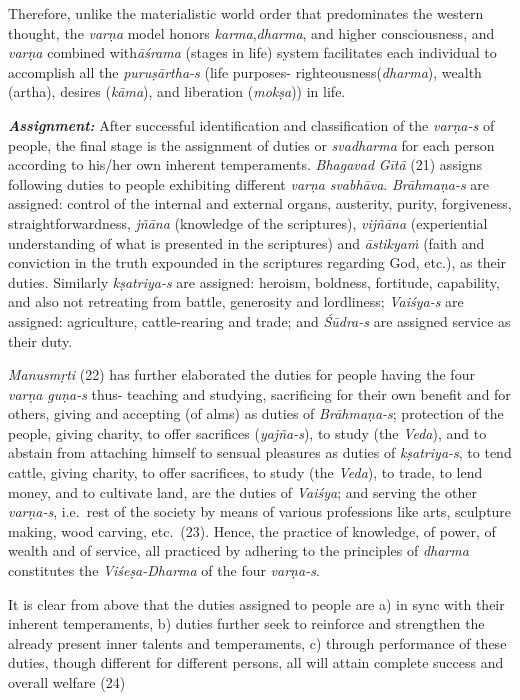 Therefore, unlike the materialistic world order that predominates the western thought, the \emph{varṇa} model honors \emph{karma},\break \emph{dharma}, and higher consciousness, and \emph{varṇa} combined with\break \emph{āśrama} (stages in life) system facilitates each individual to accomplish all the \emph{puruṣārtha-s} (life purposes- righteousness\break (\emph{dharma}), wealth (artha), desires (\emph{kāma}), and liberation (\emph{mokṣa})) in life.

\emph{\textbf{Assignment:}} After successful identification and classification of the \emph{varṇa-s} of people, the final stage is the assignment of duties or \emph{svadharma} for each person according to his/her own inherent temperaments. \emph{Bhagavad} \emph{Gītā} (21) assigns following duties to people exhibiting different \emph{varṇa} \emph{svabhāva}. \emph{Brāhmaṇa-s} are assigned: control of the internal and external organs, austerity, purity, forgiveness, straightforwardness, \emph{jñāna} (knowledge of the scriptures), \emph{vijñāna} (experiential understanding of what is presented in the scriptures) and \emph{āstikyaṁ} (faith and conviction in the truth expounded in the scriptures regarding God, etc.), as their duties. Similarly \emph{kṣatriya-s} are assigned: heroism, boldness, fortitude, capability, and also not retreating from battle, generosity and lordliness; \emph{Vaiśya-s} are assigned: agriculture, cattle-rearing and trade; and \emph{Śūdra-s} are assigned service as their duty.

\emph{Manusmṛti} (22) has further elaborated the duties for people having the four \emph{varṇa} \emph{guṇa-s} thus- teaching and studying, sacrificing for their own benefit and for others, giving and accepting (of alms) as duties of \emph{Brāhmaṇa-s}; protection of the people, giving charity, to offer sacrifices (\emph{yajña-s}), to study (the \emph{Veda}), and to abstain from attaching himself to sensual pleasures as duties of \emph{kṣatriya-s}, to tend cattle, giving charity, to offer sacrifices, to study (the \emph{Veda}), to trade, to lend money, and to cultivate land, are the duties of \emph{Vaiśya}; and serving the other \emph{varṇa-s}, i.e.\ rest of the society by means of various professions like arts, sculpture making, wood carving, etc.\ (23). Hence, the practice of knowledge, of power, of wealth and of service, all practiced by adhering to the principles of \emph{dharma} constitutes the \emph{Viśeṣa-Dharma} of the four \emph{varṇa-s}.
\vskip 2pt

It is clear from above that the duties assigned to people are a) in sync with their inherent temperaments, b) duties further seek to reinforce and strengthen the already present inner talents and temperaments, c) through performance of these duties, though different for different persons, all will attain complete success and overall welfare (24)
\vskip 2pt

